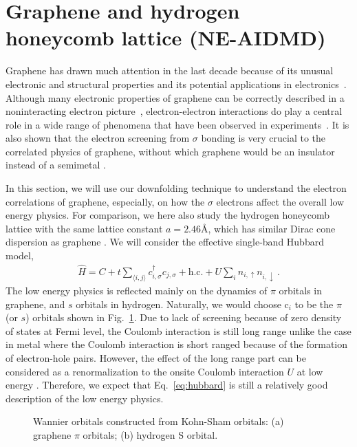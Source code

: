 \documentclass[aps, prb]{revtex4-1}
\begin{document}
\section{Graphene and hydrogen honeycomb lattice (NE-AIDMD)}
Graphene has drawn much attention in the last decade because of its unusual electronic and structural properties and its potential applications in electronics~\cite{Wallace1947, Novoselov2004,NovoselovNature2005, Katsnelson2006, Geim2007, Novoselov2007, neto2009, Castro2009}. 
Although many electronic properties of graphene can be correctly described in a noninteracting electron picture~\cite{Castro2009}, electron-electron interactions do play a central role in a wide range of phenomena that have been observed in experiments~\cite{Kotov2012}. It is also shown that the electron screening from $\sigma$ bonding is very crucial to the correlated physics of graphene, without which graphene would be an insulator instead of a semimetal \cite{Zheng2016} .

In this section, we will use our downfolding technique to understand the electron correlations of graphene, especially, on how the $\sigma$ electrons affect the overall low energy physics. For comparison, we here also study the hydrogen honeycomb lattice with the same lattice constant $a=2.46$\AA, which has similar Dirac cone dispersion as graphene \cite{Zheng2016}.  We will consider the effective single-band Hubbard model, 
\begin{eqnarray}\label{eq:hubbard}
\hat{H} = C + t\sum_{\langle i,j\rangle}c_{i, \sigma}^\dagger c_{j, \sigma} + \text{h.c.} + U\sum_{i}n_{i, \uparrow}n_{i, \downarrow}\,. 
\end{eqnarray}
The low energy physics is reflected mainly on the dynamics of $\pi$ orbitals in  graphene, and $s$ orbitals in hydrogen. Naturally, we would choose c$_i$ to be the $\pi$ (or $s$) orbitals shown in Fig.~\ref{fig:wan}. Due to lack of screening because of zero density of states at Fermi level, the Coulomb interaction is still long range unlike the case in metal where the Coulomb interaction is short ranged because of the formation of electron-hole pairs. However, the effect of the long range part can be considered as a renormalization to the onsite Coulomb interaction $U$ at low energy \cite{Schuler2013, Changlani2015}. Therefore, we expect that Eq.~\eqref{eq:hubbard} is still a relatively good description of the low energy physics. 

\begin{figure}[hbt]
  \centering  
       \caption{Wannier orbitals constructed from Kohn-Sham orbitals: (a) graphene $\pi$ orbitals; (b) hydrogen S orbital. }
\label{fig:wan}
\end{figure}
\end{document}
